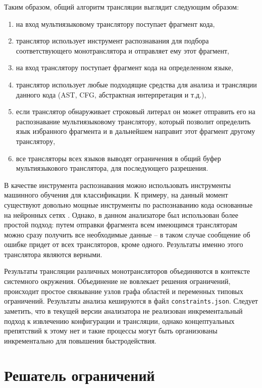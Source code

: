 Таким образом, общий алгоритм трансляции выглядит следующим образом:
\begin{enumerate}[1)]
    \item на вход мультиязыковому транслятору поступает фрагмент кода,
    \item транслятор использует инструмент распознавания для подбора соответствующего монотранслятора и отправляет ему этот фрагмент,
    \item на вход транслятору поступает фрагмент кода на определенном языке,
    \item транслятор использует любые подходящие средства для анализа и трансляции данного кода
    (AST, CFG, абстрактная интерпретация и т.д.),
    \item если транслятор обнаруживает строковый литерал он может отправить его на распознавание мультиязыковому транслятору, который
    позволит определить язык избранного фрагмента и в дальнейшем направит этот фрагмент другому транслятору,
    \item все трансляторы всех языков выводят ограничения в общий буфер мультиязыкового транслятора, для последующего разрешения.
\end{enumerate}

В качестве инструмента распознавания можно использовать инструменты машинного обучения для классификации. К примеру,
на данный момент существуют довольно мощные инструменты по распознаванию кода основанные на нейронных сетях \cite{guesslang}.
Однако, в данном анализаторе был использован более простой подход: путем отправки фрагмента всем имеющимся
трансляторам можно сразу получить все необходимые данные -- в таком случае сообщение об ошибке придет от всех трансляторов, кроме одного.
Результаты именно этого транслятора являются верными.

Результаты трансляции различных монотрансляторов объединяются в контексте системного окружения. Объединение не
вовлекает решения ограничений, происходит простое связывание узлов графа областей и переменных типовых ограничений.
Результаты анализа кешируются в файл \texttt{constraints.json}. Следует заметить, что в текущей версии
анализатора не реализован инкрементальный подход к извлечению конфигурации и трансляции, однако концептуальных
препятствий к этому нет и такие процессы могут быть организованы инкрементально для повышения быстродействия.

\section{Решатель ограничений}

